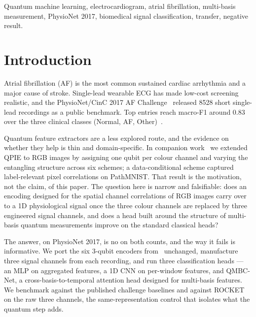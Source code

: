 \documentclass[conference,compsoc]{IEEEtran}
\begin{document}
\begin{IEEEkeywords}
Quantum machine learning, electrocardiogram, atrial fibrillation, multi-basis measurement, PhysioNet 2017, biomedical signal classification, transfer, negative result.
\end{IEEEkeywords}

\IEEEpeerreviewmaketitle

\section{Introduction}
\label{sec:intro}

Atrial fibrillation (AF) is the most common sustained cardiac arrhythmia and a major cause of stroke. Single-lead wearable ECG has made low-cost screening realistic, and the PhysioNet/CinC 2017 AF Challenge~\cite{clifford2017af} released 8528 short single-lead recordings as a public benchmark. Top entries reach macro-F1 around 0.83 over the three clinical classes (Normal, AF, Other)~\cite{clifford2017af, andreotti2017comparing, goodfellow2018towards}.

Quantum feature extractors are a less explored route, and the evidence on whether they help is thin and domain-specific. In companion work~\cite{atadana2026qpie} we extended QPIE to RGB images by assigning one qubit per colour channel and varying the entangling structure across six schemes; a data-conditional scheme captured label-relevant pixel correlations on PathMNIST. That result is the motivation, not the claim, of this paper. The question here is narrow and falsifiable: does an encoding designed for the spatial channel correlations of RGB images carry over to a 1D physiological signal once the three colour channels are replaced by three engineered signal channels, and does a head built around the structure of multi-basis quantum measurements improve on the standard classical heads?

The answer, on PhysioNet 2017, is no on both counts, and the way it fails is informative. We port the six 3-qubit encoders from~\cite{atadana2026qpie} unchanged, manufacture three signal channels from each recording, and run three classification heads --- an MLP on aggregated features, a 1D CNN on per-window features, and QMBC-Net, a cross-basis-to-temporal attention head designed for multi-basis features. We benchmark against the published challenge baselines and against ROCKET~\cite{dempster2020rocket} on the raw three channels, the same-representation control that isolates what the quantum step adds.
\end{document}

